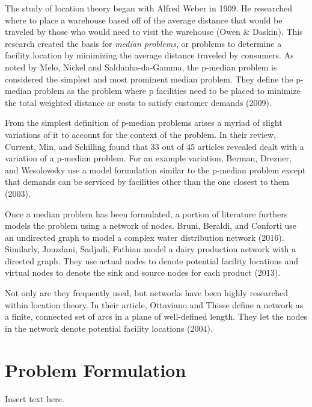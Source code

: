 \documentclass[twoside,twocolumn]{article}
\begin{document}
The study of location theory began with Alfred Weber in 1909. 
He researched where to place a warehouse based off of the average distance that would be traveled by those who would need to visit the warehouse (Owen \& Daskin).
This research created the basis for {\em median problems}, or problems to determine a facility location by minimizing the average distance traveled by consumers.
As noted by Melo, Nickel and Saldanha-da-Gamma, the p-median problem is considered the simplest and most prominent median problem. They define the p-median problem as the problem where p facilities need to be placed to minimize the total weighted distance or costs to satisfy customer demands (2009).

From the simplest definition of p-median problems arises a myriad of slight variations of it to account for the context of the problem.
In their review, Current, Min, and Schilling found that 33 out of 45 articles revealed dealt with a variation of a p-median problem.
For an example variation, Berman, Drezner, and Wesolowsky use a model formulation similar to the p-median problem except that demands can be serviced by facilities other than the one closest to them (2003).

Once a median problem has been formulated, a portion of literature furthers models the problem using a network of nodes.
Bruni, Beraldi, and Conforti use an undirected graph to model a complex water distribution network (2016).
Similarly, Jouzdani, Sadjadi, Fathian model a dairy production network with a directed graph.
They use actual nodes to denote potential facility locations and virtual nodes to denote the sink and source nodes for each product (2013).

Not only are they frequently used, but networks have been highly researched within location theory.
In their article, Ottaviano and Thisse define a network as a finite, connected set of arcs in a plane of well-defined length.
They let the nodes in the network denote potential facility locations (2004).

\section{Problem Formulation}
\label{sec:prob}
Insert text here.
\end{document}
